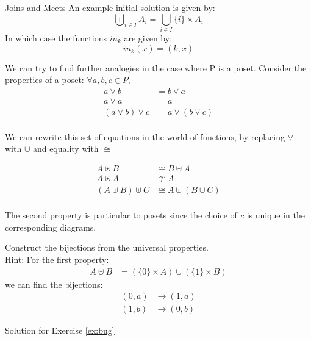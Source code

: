 \begin{section}{Joins and Meets}
        An example initial solution is given by:
        \[ \biguplus_{i \in I} A_i = \bigcup_{i \in I} \{i\} \times A_i \]
        In which case the functions $in_k$ are given by:
        \[ in_k(x) = (k, x)\]
    
        We can try to find further analogies in the case where P is a poset. Consider
        the properties of a poset: $\forall a, b, c \in P$,
        \begin{align*}
            a \vee b &= b \vee a \\
            a \vee a &= a \\
            (a \vee b) \vee c &= a \vee (b \vee c) \\
        \end{align*}
    
        We can rewrite this set of equations in the world of functions, by replacing 
        $\vee$ with $\uplus$ and equality with $\cong$
    
        \begin{align*}
            A \uplus B &\cong B \uplus A  \\
            A \uplus A &\ncong A \\ 
            (A \uplus B) \uplus C &\cong A \uplus (B \uplus C) \\ 
        \end{align*}
        
        The second property is particular to posets since the choice of \emph{c} is
        unique in the corresponding diagrams.
    
        \begin{exercise}
            Construct the bijections from the universal properties. \\
            Hint: For the first property: 
            \begin{align*}
                A \uplus B &= (\{0\} \times A) \cup (\{1\} \times B)
            \end{align*}
            we can find the bijections: 
            \begin{align*}
                (0, a) &\rightarrow (1, a)  \\ 
                (1, b) &\rightarrow (0, b)  
            \end{align*}
        \end{exercise}
    
        Solution for Exercise \ref{ex:bug}
    

\end{section}
